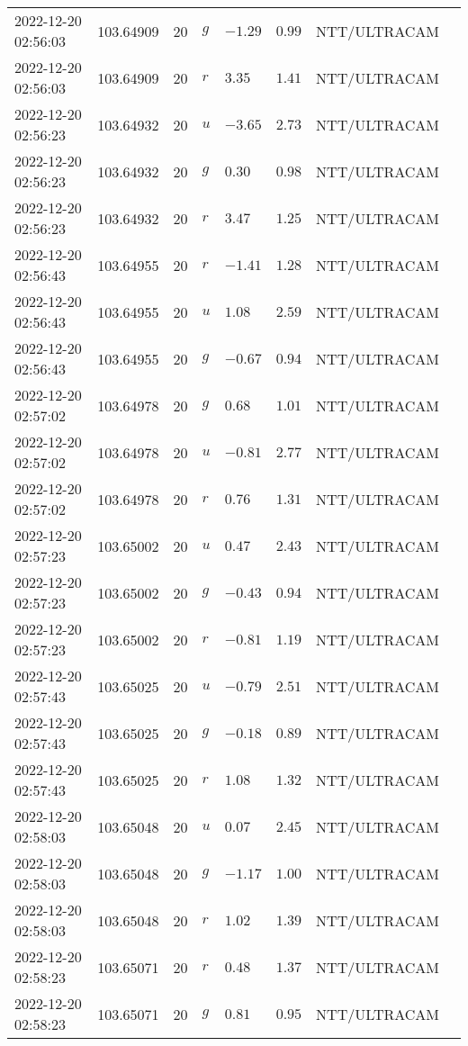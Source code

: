 \documentclass{nature_plusfigure}
\begin{document}
\begin{supplement}
\begin{center}
\begin{longtable}{llllllll}
2022-12-20 02:56:03 & 103.64909 & 20 & $g$ & $-1.29$ & $0.99$ & NTT/ULTRACAM &  \\ 
2022-12-20 02:56:03 & 103.64909 & 20 & $r$ & $3.35$ & $1.41$ & NTT/ULTRACAM &  \\ 
2022-12-20 02:56:23 & 103.64932 & 20 & $u$ & $-3.65$ & $2.73$ & NTT/ULTRACAM &  \\ 
2022-12-20 02:56:23 & 103.64932 & 20 & $g$ & $0.30$ & $0.98$ & NTT/ULTRACAM &  \\ 
2022-12-20 02:56:23 & 103.64932 & 20 & $r$ & $3.47$ & $1.25$ & NTT/ULTRACAM &  \\ 
2022-12-20 02:56:43 & 103.64955 & 20 & $r$ & $-1.41$ & $1.28$ & NTT/ULTRACAM &  \\ 
2022-12-20 02:56:43 & 103.64955 & 20 & $u$ & $1.08$ & $2.59$ & NTT/ULTRACAM &  \\ 
2022-12-20 02:56:43 & 103.64955 & 20 & $g$ & $-0.67$ & $0.94$ & NTT/ULTRACAM &  \\ 
2022-12-20 02:57:02 & 103.64978 & 20 & $g$ & $0.68$ & $1.01$ & NTT/ULTRACAM &  \\ 
2022-12-20 02:57:02 & 103.64978 & 20 & $u$ & $-0.81$ & $2.77$ & NTT/ULTRACAM &  \\ 
2022-12-20 02:57:02 & 103.64978 & 20 & $r$ & $0.76$ & $1.31$ & NTT/ULTRACAM &  \\ 
2022-12-20 02:57:23 & 103.65002 & 20 & $u$ & $0.47$ & $2.43$ & NTT/ULTRACAM &  \\ 
2022-12-20 02:57:23 & 103.65002 & 20 & $g$ & $-0.43$ & $0.94$ & NTT/ULTRACAM &  \\ 
2022-12-20 02:57:23 & 103.65002 & 20 & $r$ & $-0.81$ & $1.19$ & NTT/ULTRACAM &  \\ 
2022-12-20 02:57:43 & 103.65025 & 20 & $u$ & $-0.79$ & $2.51$ & NTT/ULTRACAM &  \\ 
2022-12-20 02:57:43 & 103.65025 & 20 & $g$ & $-0.18$ & $0.89$ & NTT/ULTRACAM &  \\ 
2022-12-20 02:57:43 & 103.65025 & 20 & $r$ & $1.08$ & $1.32$ & NTT/ULTRACAM &  \\ 
2022-12-20 02:58:03 & 103.65048 & 20 & $u$ & $0.07$ & $2.45$ & NTT/ULTRACAM &  \\ 
2022-12-20 02:58:03 & 103.65048 & 20 & $g$ & $-1.17$ & $1.00$ & NTT/ULTRACAM &  \\ 
2022-12-20 02:58:03 & 103.65048 & 20 & $r$ & $1.02$ & $1.39$ & NTT/ULTRACAM &  \\ 
2022-12-20 02:58:23 & 103.65071 & 20 & $r$ & $0.48$ & $1.37$ & NTT/ULTRACAM &  \\ 
2022-12-20 02:58:23 & 103.65071 & 20 & $g$ & $0.81$ & $0.95$ & NTT/ULTRACAM &  \\ 

\end{longtable}
\end{center}
\end{supplement}
\end{document}
